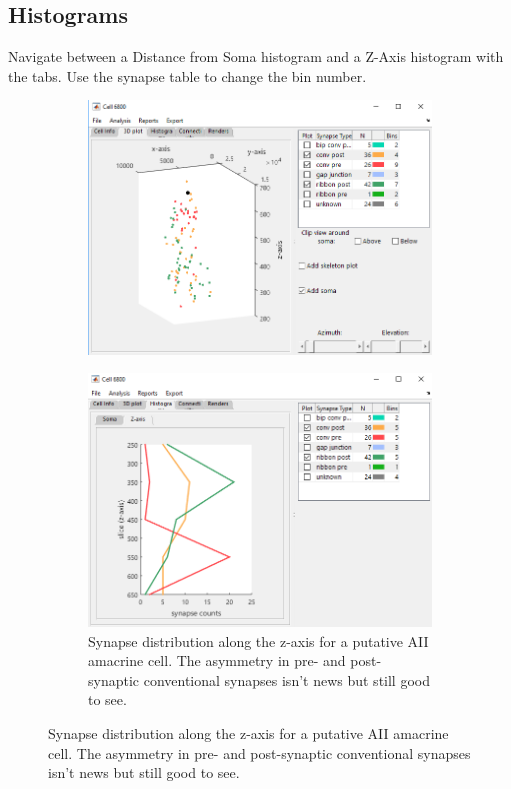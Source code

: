 \documentclass[]{exam}
\begin{document}
		\subsection{Histograms}
		Navigate between a Distance from Soma histogram and a Z-Axis histogram with the tabs. Use the synapse table to change the bin number.
		\begin{figure}[h]
			\begin{subfigure}{0.5\textwidth}
				\includegraphics[width=\linewidth]{c6800_plot3}
			\end{subfigure}
			\begin{subfigure}{0.5\textwidth}
				\includegraphics[width=\linewidth]{c6800_histZ}
				\caption{Synapse distribution along the z-axis for a putative AII amacrine cell. The asymmetry in pre- and post-synaptic conventional synapses isn't news but still good to see.}
			\end{subfigure}
		\end{figure}
\end{document}
